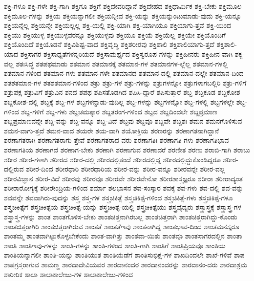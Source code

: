 {ಶಕ್ತಿ-ಗಳೂ
ಶಕ್ತಿ-ಗಳೇ
ಶಕ್ತಿ-ಗಾಗಿ
ಶಕ್ತಿಗೂ
ಶಕ್ತಿಗೆ
ಶಕ್ತಿದೇವರಿದ್ದಾನೆ
ಶಕ್ತಿದೇಹದ
ಶಕ್ತಿಧಾರ್ಮಿಕ
ಶಕ್ತಿ-ಬೇಕು
ಶಕ್ತಿಮೂಲ
ಶಕ್ತಿಮೂಲ-ಗಳನ್ನು
ಶಕ್ತಿಯ
ಶಕ್ತಿಯನ್ನಾಗಲೀ
ಶಕ್ತಿಯನ್ನೀವ
ಶಕ್ತಿ-ಯನ್ನು
ಶಕ್ತಿಯನ್ನುಂಟುಮಾಡು-ವುದು
ಶಕ್ತಿ-ಯನ್ನೂ
ಶಕ್ತಿಯನ್ನೆಲ್ಲ
ಶಕ್ತಿಯನ್ನೇ
ಶಕ್ತಿಯಲ್ಲಲ್ಲ
ಶಕ್ತಿ-ಯಲ್ಲಿ
ಶಕ್ತಿ-ಯಾಗಿ
ಶಕ್ತಿ-ಯಾಗಿಯೂ
ಶಕ್ತಿಯಾಗು-ತ್ತವೆ
ಶಕ್ತಿ-ಯಿಂದ
ಶಕ್ತಿಯು
ಶಕ್ತಿಯುಳ್ಳ
ಶಕ್ತಿಯುಳ್ಳವರನ್ನೂ
ಶಕ್ತಿಯುಳ್ಳವು
ಶಕ್ತಿಯೂ
ಶಕ್ತಿಯೆ
ಶಕ್ತಿಯೆಲ್ಲ
ಶಕ್ತಿಯೇ
ಶಕ್ತಿಯೊಂದಿಗೆ
ಶಕ್ತಿಯೊಂದಿದೆ
ಶಕ್ತಿಯೊಡನೆ
ಶಕ್ತಿವಿಶಿಷ್ಟ-ವಾದ
ಶಕ್ತಿವೃದ್ಧಿ
ಶಕ್ತಿಶರೀರವು
ಶಕ್ತಿಶಾಲಿ
ಶಕ್ತಿಶಾಲಿಯಾಗು-ತ್ತದೆ
ಶಕ್ತಿಶಾಲಿ-ಯಾದ
ಶಕ್ತಿಸಾಗರ
ಶಕ್ತಿಸಾಧ್ಯತೆಗಳನ್ನರಿಯದೆ
ಶಕ್ತಿಸಾಮರ್ಥ್ಯದ
ಶಕ್ತಿಸ್ವರೂಪ-ಗಳನ್ನು
ಶಕ್ತಿಹೀನರು
ಶಕ್ತಿಹೀನ-ವಾಗಿ
ಶಕ್ಯ-ವಲ್ಲ
ಶತಃಸಿದ್ಧ
ಶತಪಥಮಾಡು
ಶತಮಾನ
ಶತಮಾನಕ್ಕೆ
ಶತಮಾನ-ಗಳ
ಶತಮಾನಗಳ-ಲ್ಲೆಲ್ಲ
ಶತಮಾನ-ಗಳಲ್ಲಿ
ಶತಮಾನ-ಗಳಿಂದ
ಶತಮಾನ-ಗಳು
ಶತಮಾನ-ಗಳೇ
ಶತಮಾನದ
ಶತಮಾನ-ದಲ್ಲಿ
ಶತಮಾನ-ದಲ್ಲೇ
ಶತಮಾನ-ದಿಂದ
ಶತಶತಮಾನ-ಗಳ
ಶತಶತಮಾನ-ಗಳಿಂದ
ಶತ್ರು
ಶತ್ರು-ಗಳ
ಶತ್ರು-ಗಳನ್ನು
ಶತ್ರುಗಳನ್ನೋ
ಶತ್ರುಗಳಾಗಬಲ್ಲಿರಿ
ಶತ್ರು-ಗಳಿಗೆ
ಶತ್ರುಪಕ್ಷ
ಶತ್ರುವಿಗೆ
ಶತ್ರುವಿನ
ಶನದ
ಶಪಥ
ಶಪಿಸತೊಡಗಿದ
ಶಪಿಸಿ-ದ್ದಾರೆ
ಶಪಿಸುತ್ತಾರೆ
ಶಬ್ದ
ಶಬ್ದಕೂಡ
ಶಬ್ದಕೋಶ
ಶಬ್ದಕೋಶ-ದಲ್ಲಿ
ಶಬ್ದಕ್ಕೆ
ಶಬ್ದ-ಗಳ
ಶಬ್ದಗಳನ್ನಾಡು-ವುದಿಲ್ಲ
ಶಬ್ದ-ಗಳನ್ನು
ಶಬ್ದಗಳನ್ನೋ
ಶಬ್ದ-ಗಳಲ್ಲಿ
ಶಬ್ದಗಳಲ್ಲೇ
ಶಬ್ದ-ಗಳಿಂದ
ಶಬ್ದ-ಗಳಿಗೆ
ಶಬ್ದ-ಗಳು
ಶಬ್ದಚಮತ್ಕಾರ
ಶಬ್ದತರಂಗ-ಗಳಿಂದ
ಶಬ್ದದ
ಶಬ್ದದಿಂದಲೇ
ಶಬ್ದಪ್ರಮಾಣ
ಶಬ್ದಪ್ರಮಾಣವನ್ನೇ
ಶಬ್ದ-ವನ್ನು
ಶಬ್ದ-ವನ್ನೂ
ಶಬ್ದ-ವಿದೆ
ಶಬ್ದವು
ಶಬ್ದವೂ
ಶಬ್ದವೇ
ಶಬ್ದಶಃ
ಶಮನ
ಶಮನಗೊಳಿಸುವ
ಶಮನ-ವಾಗು-ತ್ತದೆ
ಶಮನ-ವಾದ
ಶಯರೇ
ಶಯ-ವಾಗಿ
ಶಯೋಕ್ತಿಯ
ಶರಣರನ್ನು
ಶರಣಾಗತನಾಗಿದ್ದಾನೆ
ಶರಣಾಗತರಾಗಿ
ಶರಣಾಗತರಾಗು-ತ್ತೇವೆ
ಶರಣಾಗತರಾದ-ವರು
ಶರಣಾಗತಿಃ
ಶರಣಾಗತಿ-ಗಳು
ಶರಣಾಗತಿಭಾವ
ಶರಣಾಗತಿಯ
ಶರಣಾಗದೆ
ಶರಣಾಗ-ಬೇಕು
ಶರಣಾಗಿ
ಶರಣಾಗುವ
ಶರಣಾದರೆ
ಶರಣೀತ
ಶರಣು
ಶರಾಬಿ-ಗಾಗಿ
ಶರಾಬು
ಶರೀರ
ಶರೀರ-ಗಳಾಗಿ
ಶರೀರದ
ಶರೀರ-ದಲ್ಲಿ
ಶರೀರದಲ್ಲಿತಂದೆ
ಶರೀರದಲ್ಲಿದ್ದ
ಶರೀರದಲ್ಲಿದ್ದುಕೊಂಡಿದ್ದರೂ
ಶರೀರ-ದಲ್ಲಿರುವ
ಶರೀರ-ದಿಂದ
ಶರೀರಧಾರಿ
ಶರೀರಧಾರಿಯ
ಶರೀರ-ವನ್ನು
ಶರೀರ-ವನ್ನೂ
ಶರೀರವನ್ನೇ
ಶರೀರ-ವಲ್ಲ
ಶರೀರವಿಜ್ಞಾನ
ಶರೀರ-ವಿದೆ
ಶರೀರವು
ಶರೀರವೂ
ಶರೀರವೇ
ಶರೀರವೇನೋ
ಶರೀರಶಾಸ್ತ್ರಜ್ಞರೂ
ಶರೀರಾ
ಶರೀರಾದ್ಯಂತ
ಶರೀರಾರೋಗ್ಯಕ್ಕೆ
ಶರೀರೇಂದ್ರಿಯ-ಗಳಿಂದ
ಶರ್ಮಾ
ಶಲಭಾಸನ
ಶವ-ಸಂಸ್ಕಾರ
ಶವಕ್ಕೆ
ಶವ-ಗಳು
ಶವ-ದಲ್ಲಿ
ಶವ-ವನ್ನು
ಶವವನ್ನೇ
ಶವವಾಗಿರು-ವುದನ್ನು
ಶಸ್ತ್ರ
ಶಸ್ತ್ರ-ಗಳ
ಶಸ್ತ್ರಚಿಕಿತ್ಸೆ
ಶಸ್ತ್ರಚಿಕಿತ್ಸೆ-ಗಳಿಂದ
ಶಸ್ತ್ರಚಿಕಿತ್ಸೆ-ಗಳು
ಶಸ್ತ್ರಚಿಕಿತ್ಸೆ-ಗಳೂ
ಶಸ್ತ್ರಚಿಕಿತ್ಸೆಗೆ
ಶಸ್ತ್ರಚಿಕಿತ್ಸೆಯ
ಶಸ್ತ್ರಚಿಕಿತ್ಸೆ-ಯನ್ನು
ಶಸ್ತ್ರಚಿಕಿತ್ಸೆ-ಯಲ್ಲಿ
ಶಸ್ತ್ರಚಿಕಿತ್ಸೆಯು
ಶಸ್ತ್ರವೈದ್ಯರು
ಶಸ್ತ್ರಾಸ್ತ್ರಕ್ಕೆ
ಶಸ್ತ್ರಾಸ್ತ್ರ-ಗಳ
ಶಸ್ತ್ರಾಸ್ತ್ರ-ಗಳನ್ನು
ಶಾಂತ
ಶಾಂತಗೊಳಿಸ-ಬೇಕು
ಶಾಂತಚಿತ್ತನಾಗಿರಬಲ್ಲ
ಶಾಂತಚಿತ್ತರಾಗಿ
ಶಾಂತಚಿತ್ತರಾಗಿದ್ದು-ಕೊಂಡು
ಶಾಂತಚಿತ್ತರಾಗಿರಿ
ಶಾಂತಚಿತ್ತರಾಗಿರುವ
ಶಾಂತತೆ
ಶಾಂತತೆಇವು
ಶಾಂತನಾಗಿದ್ದ
ಶಾಂತಭಾವ-ದಿಂದ
ಶಾಂತಮನಸ್ಕರೂ
ಶಾಂತಮ್ಮ
ಶಾಂತವಾಗಿಟ್ಟುಕೊಳ್ಳಬೇಕೆಂದು
ಶಾಂತ-ವಾಗಿತ್ತು
ಶಾಂತವಾ-ಯಿತು
ಶಾಂತವೂ
ಶಾಂತಸಾಗರದಲ್ಲಿನ
ಶಾಂತಾ
ಶಾಂತಿ
ಶಾಂತಿಇವು-ಗಳನ್ನು
ಶಾಂತಿ-ಗಳನ್ನು
ಶಾಂತಿ-ಗಳಿಂದ
ಶಾಂತಿ-ಗಾಗಿ
ಶಾಂತಿಗೆ
ಶಾಂತಿಪ್ರಿಯವೂ
ಶಾಂತಿಯ
ಶಾಂತಿಯನ್ನಾಗಲೀ
ಶಾಂತಿ-ಯನ್ನು
ಶಾಂತಿಯುತ
ಶಾಂತಿಯೆಡೆಗೆ
ಶಾಂತಿಸುಭಿಕ್ಷೆ-ಗಳ
ಶಾಖದಿಂದಲೇ
ಶಾಖೆ-ಗಳಿವೆ
ಶಾಪ
ಶಾಪಗ್ರಸ್ತರಾಗುವ
ಶಾಮಣ್ಣ
ಶಾರದಾದೇವಿಯವರ
ಶಾರದಾನಂದರ
ಶಾರದಾನಂದರನ್ನು
ಶಾರದಾನಂ-ದರು
ಶಾರದಾಶ್ರಮ
ಶಾರೀರಿಕ
ಶಾಲಾ
ಶಾಲಾಕಾಲೇಜು-ಗಳ
ಶಾಲಾಕಾಲೇಜು-ಗಳಿಂದ
}
